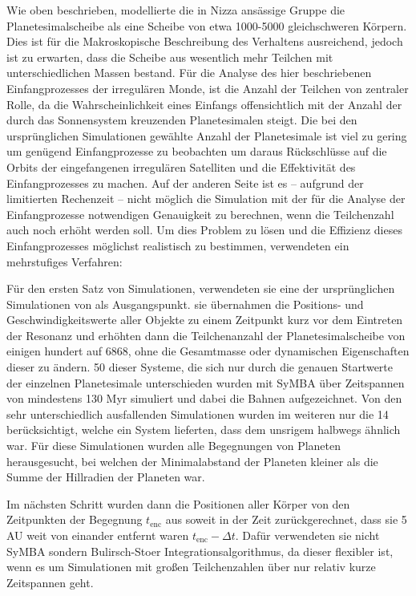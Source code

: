 \documentclass[12pt,a4paper,twoside]{article}
\renewcommand{\cite}{\citep}
\begin{document}
Wie oben beschrieben, modellierte die in Nizza ansässige Gruppe die Planetesimalscheibe als eine Scheibe von etwa 1000-5000 gleichschweren Körpern. Dies ist für die Makroskopische Beschreibung des Verhaltens ausreichend, jedoch ist zu erwarten, dass die Scheibe aus wesentlich mehr Teilchen mit unterschiedlichen Massen bestand.
Für die Analyse des hier beschriebenen Einfangprozesses der irregulären Monde, ist die Anzahl der Teilchen von zentraler Rolle, da die Wahrscheinlichkeit eines Einfangs offensichtlich mit der Anzahl der durch das Sonnensystem kreuzenden Planetesimalen steigt.
Die bei den ursprünglichen Simulationen gewählte Anzahl der Planetesimale ist viel zu gering um genügend Einfangprozesse zu beobachten um daraus Rückschlüsse auf die Orbits der eingefangenen irregulären Satelliten und die Effektivität des Einfangprozesses zu machen.
Auf der anderen Seite ist es -- aufgrund der limitierten Rechenzeit -- nicht möglich die Simulation mit der für die Analyse der Einfangprozesse notwendigen Genauigkeit zu berechnen, wenn die Teilchenzahl auch noch erhöht werden soll.
Um dies Problem zu lösen und die Effizienz dieses Einfangprozesses möglichst realistisch zu bestimmen, verwendeten \cite{Nesvorny2007} ein mehrstufiges Verfahren:

Für den ersten Satz von Simulationen, verwendeten sie eine der ursprünglichen Simulationen von \cite{Gomes2005} als Ausgangspunkt.
sie übernahmen die Positions- und Geschwindigkeitswerte aller Objekte zu einem Zeitpunkt kurz vor dem Eintreten der Resonanz und erhöhten dann die Teilchenanzahl der Planetesimalscheibe von einigen hundert auf 6868, %
ohne die Gesamtmasse oder dynamischen Eigenschaften dieser zu ändern. 50 dieser Systeme, die sich nur durch die genauen Startwerte der einzelnen Planetesimale unterschieden wurden mit SyMBA über Zeitspannen von mindestens 130 Myr simuliert und dabei die Bahnen aufgezeichnet.
Von den sehr unterschiedlich ausfallenden Simulationen wurden im weiteren nur die 14 berücksichtigt, welche ein System lieferten, dass dem unsrigem halbwegs ähnlich war\cite{Nesvorny2007}.
Für diese Simulationen wurden alle Begegnungen von Planeten herausgesucht, bei welchen der Minimalabstand der Planeten kleiner als die Summe der Hillradien der Planeten war.

Im nächsten Schritt wurden dann die Positionen aller Körper von den Zeitpunkten der Begegnung $t_{\mathrm{enc}}$ aus soweit in der Zeit zurückgerechnet, dass sie 5 AU weit von einander entfernt waren  $t_{\mathrm{enc}} - \Delta t$\cite{Nesvorny2007}.
Dafür verwendeten sie nicht SyMBA sondern Bulirsch-Stoer Integrationsalgorithmus, da dieser flexibler ist, wenn es um Simulationen mit großen Teilchenzahlen über nur relativ kurze Zeitspannen geht.
\end{document}
